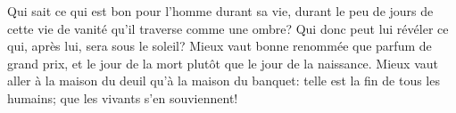 Qui sait ce qui est bon pour l’homme durant sa vie,
	durant le peu de jours de cette vie de vanité qu’il traverse comme une ombre?
	Qui donc peut lui révéler ce qui, après lui, sera sous le soleil?
Mieux vaut bonne renommée que parfum de grand prix,
	et le jour de la mort plutôt que le jour de la naissance.
Mieux vaut aller à la maison du deuil qu’à la maison du banquet:
	telle est la fin de tous les humains; que les vivants s’en souviennent!
